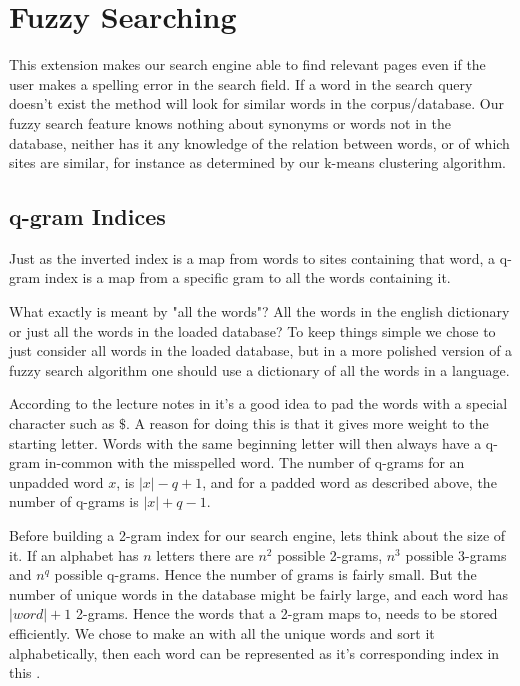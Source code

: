 \section{Fuzzy Searching}
This extension makes our search engine able to find relevant pages even if the user makes a spelling error in the search field. If a word in the search query doesn't exist the  method will look for similar words in the corpus/database. 
Our fuzzy search feature knows nothing about synonyms or words not in the database, neither has it any knowledge of the relation between words, or of which sites are similar, for instance as determined by our k-means clustering algorithm.  

\subsection{q-gram Indices}
Just as the inverted index is a map from words to sites containing that word, a q-gram index is a map from a specific gram to all the words containing it. 

What exactly is meant by "all the words"? All the words in the english dictionary or just all the words in the loaded database? To keep things simple we chose to just consider all words in the loaded database, but in a more polished version of a fuzzy search algorithm one should use a dictionary of all the words in a language. 

According to the lecture notes in \cite{lectureNotes} it's a good idea to pad the words with a special character such as \(\$\). A reason for doing this is that it gives more weight to the starting letter. Words with the same beginning letter will then always have a q-gram in-common with the misspelled word. 
The number of q-grams for an unpadded word \(x\), is \(|x| - q + 1\), and for a padded word as described above, the number of q-grams is \(|x| + q - 1\).  

Before building a 2-gram index for our search engine, lets think about the size of it.
If an alphabet has \(n\) letters there are \(n^2\) possible 2-grams, \(n^3\) possible 3-grams and \(n^q\) possible q-grams. Hence the number of grams is fairly small. But the number of unique words in the database might be fairly large, and each word has \(|word| + 1\) 2-grams. Hence the words that a 2-gram maps to, needs to be stored efficiently. 
We chose to make an  with all the unique words and sort it alphabetically, then each word can be represented as it's corresponding index in this .

